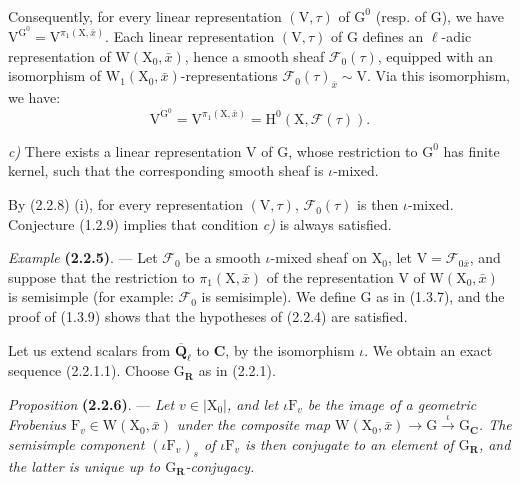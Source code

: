 \documentclass[11pt,leqno]{article}
\newcommand{\Page}[1]{\ifvmode\noindent\else\unskip\ \fi{\footnotesize\textcolor{gray}{[p.\,#1]}}\ \ignorespaces}
\begin{document}
\Page{194}

Consequently, for every linear representation \((\mathrm V,\tau)\) of \(\mathrm G^0\) (resp. of \(\mathrm G\)), we have \(\mathrm V^{\mathrm G^0}=\mathrm V^{\pi_1(\mathrm X,\bar{x})}\). Each linear representation \((\mathrm V,\tau)\) of \(\mathrm G\) defines an \(\ell\)-adic representation of \(\mathrm W(\mathrm X_0,\bar{x})\), hence a smooth sheaf \(\mathscr F_0(\tau)\), equipped with an isomorphism of \(\mathrm W_1(\mathrm X_0,\bar{x})\)-representations \(\mathscr F_0(\tau)_{\bar{x}}\sim\mathrm V\). Via this isomorphism, we have:
\[
\mathrm V^{\mathrm G^0}
=\mathrm V^{\pi_1(\mathrm X,\bar{x})}
=\mathrm H^0(\mathrm X,\mathscr F(\tau)).
\]

\textit{c)} There exists a linear representation \(\mathrm V\) of \(\mathrm G\), whose restriction to \(\mathrm G^0\) has finite kernel, such that the corresponding smooth sheaf is \(\iota\)-mixed.

By (2.2.8) (i), for every representation \((\mathrm V,\tau)\), \(\mathscr F_0(\tau)\) is then \(\iota\)-mixed. Conjecture (1.2.9) implies that condition \textit{c)} is always satisfied.

\textit{Example} \textbf{(2.2.5)}. — Let \(\mathscr F_0\) be a smooth \(\iota\)-mixed sheaf on \(\mathrm X_0\), let \(\mathrm V=\mathscr F_{0\bar{x}}\), and suppose that the restriction to \(\pi_1(\mathrm X,\bar{x})\) of the representation \(\mathrm V\) of \(\mathrm W(\mathrm X_0,\bar{x})\) is semisimple (for example: \(\mathscr F_0\) is semisimple). We define \(\mathrm G\) as in (1.3.7), and the proof of (1.3.9) shows that the hypotheses of (2.2.4) are satisfied.

Let us extend scalars from \(\overline{\mathbf Q}_\ell\) to \(\mathbf C\), by the isomorphism \(\iota\). We obtain an exact sequence (2.2.1.1). Choose \(\mathrm G_{\mathbf R}\) as in (2.2.1).

\textit{Proposition} \textbf{(2.2.6)}. — \textit{Let \(v\in|\mathrm X_0|\), and let \(\iota\mathrm F_v\) be the image of a geometric Frobenius \(\mathrm F_v\in\mathrm W(\mathrm X_0,\bar{x})\) under the composite map \(\mathrm W(\mathrm X_0,\bar{x})\to\mathrm G\xrightarrow{\iota}\mathrm G_{\mathbf C}\). The semisimple component \((\iota\mathrm F_v)_s\) of \(\iota\mathrm F_v\) is then conjugate to an element of \(\mathrm G_{\mathbf R}\), and the latter is unique up to \(\mathrm G_{\mathbf R}\)-conjugacy.}
\end{document}

